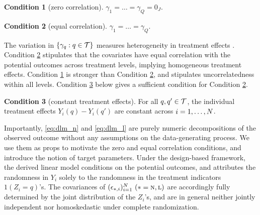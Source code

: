 \documentclass[11pt]{article}
\theoremstyle{definition}
\newtheorem{condition}{Condition}
\begin{document}
 


\begin{condition}[zero correlation] \label{cond:zero}
$
\gamma_1 = \dots = \gamma_Q = 0_J$.  
\end{condition}

\begin{condition}[equal correlation]\label{cond:equal}
$
\gamma_1 = \dots = \gamma_Q
$. 
\end{condition}

The variation in $\{\gamma_q:q\in\mathcal{T}\}$ measures heterogeneity in treatment effects \citep{Ding2019}.
Condition \ref{cond:equal} stipulates that the covariates have equal correlation with the potential outcomes across treatment levels, implying homogeneous treatment effects. 
Condition \ref{cond:zero} is stronger than Condition \ref{cond:equal}, and stipulates uncorrelatedness within all levels. 
%
%
Condition \ref{cond:sa} below gives a sufficient condition for  Condition \ref{cond:equal}.

\begin{condition}[constant treatment effects]  
\label{cond:sa}
For all $q, q'\in\mathcal{T}$, 
the individual treatment effects $Y_i(q) - Y_i(q')$
are constant across $i = 1, \ldots,N$. 
\end{condition}



 
Importantly, \eqref{eq:dlm_n} and \eqref{eq:dlm_l} are purely numeric decompositions of the observed outcome without any assumptions on the data-generating process. 
We use them as props to motivate the zero and equal correlation conditions, and introduce the notion of target parameters. 
Under the design-based framework,
the derived linear model
conditions on the potential outcomes, and attributes the
randomness in $Y_i$ solely to the randomness in the treatment indicators $1(Z_i = q)$'s. 
The covariances of $(\epsilon_{*, i})_{i=1}^N \ (* = \textsc{n}, \textsc{l})$ are accordingly fully determined by the joint distribution of the $Z_i$'s, and are in general neither jointly independent nor homoskedastic under complete randomization.
\end{document}
